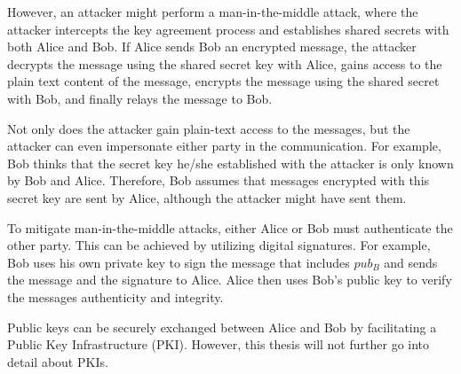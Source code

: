 However, an attacker might perform a man-in-the-middle attack, where the
attacker intercepts the key agreement process and establishes shared secrets
with both Alice and Bob. If Alice sends Bob an encrypted message, the attacker
decrypts the message using the shared secret key with Alice, gains access to the
plain text content of the message, encrypts the message using the shared secret
with Bob, and finally relays the message to Bob.

Not only does the attacker gain plain-text access to the messages, but the
attacker can even impersonate either party in the communication. For example,
Bob thinks that the secret key he/she established with the attacker is only
known by Bob and Alice. Therefore, Bob assumes that messages encrypted with this
secret key are sent by Alice, although the attacker might have sent them.

To mitigate man-in-the-middle attacks, either Alice or Bob must authenticate the
other party. This can be achieved by utilizing digital signatures. For example,
Bob uses his own private key to sign the message that includes $pub_B$ and sends
the message and the signature to Alice. Alice then uses Bob's public key to
verify the messages authenticity and integrity.

Public keys can be securely exchanged between Alice and Bob by facilitating a
Public Key Infrastructure (PKI). However, this thesis will not further go into
detail about PKIs.
